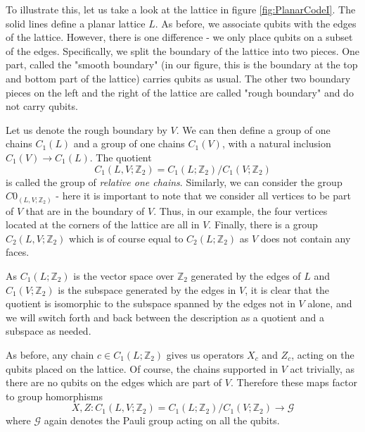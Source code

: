 \documentclass[a4paper, draft]{article}
\theoremstyle{own}
\theoremstyle{remark}
\newcommand{\Z}{\mathbb{Z}}
\begin{document}
To illustrate this, let us take a look at the lattice in figure \ref{fig:PlanarCodeI}. The solid lines define a planar lattice $L$. As before, we associate qubits with the edges of the lattice. However, there is one difference - we only place qubits on a subset of the edges. Specifically, we split the boundary of the lattice into two pieces. One part, called the "smooth boundary" (in our figure, this is the boundary at the top and bottom part of the lattice) carries qubits as usual. The other two boundary pieces on the left and the right of the lattice are called "rough boundary" and do not carry qubits.

Let us denote the rough boundary by $V$. We can then define a group of one chains $C_1(L)$ and a group of one chains $C_1(V)$, with a natural inclusion $C_1(V) \rightarrow C_1(L)$. The quotient 
$$
C_1(L,V;\Z_2) = C_1(L;\Z_2) / C_1(V;\Z_2)
$$
is called the group of \emph{relative one chains}. Similarly, we can consider the group $C0_(L,V;\Z_2)$ - here it is important to note that we consider all vertices to be part of $V$ that are in the boundary of $V$. Thus, in our example, the four vertices located at the corners of the lattice are all in $V$. Finally, there is a group $C_2(L,V;\Z_2)$ which is of course equal to $C_2(L;\Z_2)$ as $V$ does not contain any faces.

As $C_1(L;\Z_2)$ is the vector space over $\Z_2$ generated by the edges of $L$ and $C_1(V;\Z_2)$ is the subspace generated by the edges in $V$, it is clear that the quotient is isomorphic to the subspace spanned by the edges not in $V$ alone, and we will switch forth and back between the description as a quotient and a subspace as needed. 

As before, any chain $c \in C_1(L;\Z_2)$ gives us operators $X_c$ and $Z_c$, acting on the qubits placed on the lattice. Of course, the chains supported in $V$ act trivially, as there are no qubits on the edges which are part of $V$. Therefore these maps factor to group homorphisms
$$
X, Z \colon C_1(L,V; \Z_2) = C_1(L;\Z_2) / C_1(V;\Z_2) \rightarrow \mathcal{G}
$$
where $\mathcal{G}$ again denotes the Pauli group acting on all the qubits. 
\end{document}
